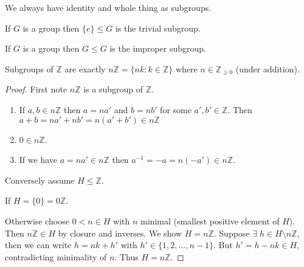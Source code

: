 We always have identity and whole thing as subgroups.

\begin{example}
If $G$ is a group then $\{ e \} \leq G$ is the trivial subgroup.
\end{example}

\begin{example}
If $G$ is a group then $G \leq G$ is the improper subgroup.
\end{example}

\begin{proposition}
\protect\hypertarget{prp:nZ}{}\label{prp:nZ}Subgroups of $\mathbb{Z}$ are exactly $n \mathbb{Z} = \{nk : k \in \mathbb{Z}\}$ where $n \in \mathbb{Z}_{\geq 0}$ (under addition).
\end{proposition}

\begin{proof}
First note $n \mathbb{Z}$ is a subgroup of $\mathbb{Z}$.

\begin{enumerate}
\def\labelenumi{\alph{enumi}.}
\item
  If $a, b \in n \mathbb{Z}$ then $a = na'$ and $b = nb'$ for some $a', b' \in \mathbb{Z}$.
  Then $a + b = na' + nb' = n (a' + b') \in n \mathbb{Z}$
\item
  $0 \in n \mathbb{Z}$.
\item
  If we have $a = na' \in n \mathbb{Z}$ then $a^{-1} = -a = n(-a') \in n \mathbb{Z}$.
\end{enumerate}

Conversely assume $H \leq \mathbb{Z}$.

If $H = \{ 0 \} = 0 \mathbb{Z}$.

Otherwise choose $0 < n \in H$ with $n$ minimal (smallest positive element of $H$).
Then $n \mathbb{Z} \in H$ by closure and inverses. We show $H = n \mathbb{Z}$. Suppose $\exists \; h \in H \setminus n \mathbb{Z}$, then we can write $h = nk + h'$ with $h' \in \{ 1, 2, \dots, n -1 \}$. But $h' = h - nk \in H$, contradicting minimality of $n$. Thus $H = n \mathbb{Z}$.
\end{proof}

